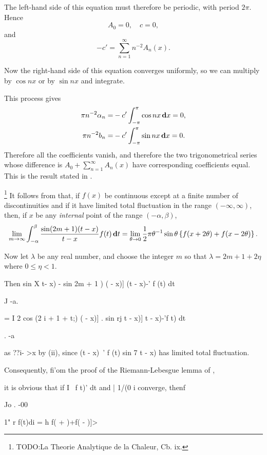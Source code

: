 The left-hand side of this equation must therefore be periodic, with
period $2\pi$. Hence
$$
A_{0} = 0,
\quad
c = 0,
$$
and
$$
-c' = \sum_{n=1}^{\infty} n^{-2} A_{n}(x).
$$

Now the right-hand side of this equation converges uniformly, so we
can multiply by $\cos nx$ or by $\sin nx$ and integrate.

This process gives
\begin{align*}
  \pi n^{-2} \alpha_{n}
  =&
  - c' \int_{-\pi}^{\pi} \cos nx \, \mathbf{d} x = 0,
  \\
  \pi n^{-2} b_{n}
  =&
  - c' \int_{-\pi}^{\pi} \sin nx \, \mathbf{d} x = 0.
\end{align*}
%
%
Therefore all the coefficients vanish, and therefore the two
trigonometrical series whose difference is
$A_{0} + \sum_{n=1}^{\infty} A_{n}(x)$ have
corresponding coefficients equal.
This is the result stated in .

\footnote{TODO:La Theorie Analytique de la Chaleur, Cb. ix.}
It follows from  that, if $f(x)$ be continuous except at a
finite number of discontinuities and if it have limited total
fluctuation in the range $(-\infty, \infty)$, then, if $x$ be any
\emph{internal} point of the range $(-\alpha, \beta)$,
$$
\lim_{m \rightarrow \infty}
\int_{-\alpha}^{\beta}
\frac{\sin (2m + 1)(t - x)}{t - x}
f(t) \, \mathbf{d} t
=
\lim_{\theta \rightarrow 0}
\frac{1}{2} \pi \theta^{-1} \sin \theta
\left\{ 
  f(x + 2\theta) + f(x - 2 \theta)
 \right\}.
$$

Now let $\lambda$ be any real number, and choose the integer $m$ so that
$\lambda = 2m + 1 + 2\eta$ where $0 \leq \eta < 1$.

Then sin X t- x) - sin 2m + 1 ) ( - x)] (t - x)-' f (t) dt

J -a.

= I 2 cos (2 i + 1 + t;) ( - x)] . sin rj t - x)] t - x)-'f t) dt

. -a

as ??i- >x by  (ii), since (t - x)~' f (t) sin 7 t - x) has
limited total fluctuation.

Consequently, fi'om the proof of the Riemann-Lebesgue lemma of ,

it is obvious that if I \ f t)' dt and | 1/(0 i converge, thenf

Jo . -00

1" r f(t)di = h f( + )+f( - )]>

